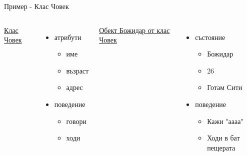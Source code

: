 \documentclass{beamer}
\begin{document}
\begin{frame}{Пример - Клас Човек}
  \transdissolve
  \begin{columns}
    \underline{Клас Човек}
    \begin{itemize}
    \item атрибути \pause
      \begin{itemize}
      \item име \pause
      \item възраст \pause
      \item адрес \pause
      \end{itemize}
    \item поведение \pause
      \begin{itemize}
      \item говори \pause
      \item ходи \pause
      \end{itemize}
    \end{itemize}
    \underline{Обект Божидар от клас Човек}
    \begin{itemize}
    \item състояние \pause
      \begin{itemize}
      \item Божидар \pause
      \item 26  \pause
      \item Готам Сити \pause
      \end{itemize}
    \item поведение \pause
      \begin{itemize}
      \item Кажи "аааа" \pause
      \item Ходи в бат пещерата
      \end{itemize}
    \end{itemize}
  \end{columns}
\end{frame}
\end{document}
